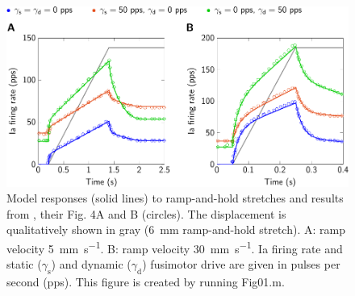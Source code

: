 \documentclass[fleqn,10pt]{physiome}
\begin{document}
\begin{figure}
    \centering
    \includegraphics[width=\textwidth]{Figure1.pdf}
    \caption{Model responses (solid lines) to ramp-and-hold stretches and results from \citet{maltenfort2003}, their Fig. 4A and B (circles).  The displacement is qualitatively shown in gray (\SI{6}{\milli\meter} ramp-and-hold stretch). A: ramp velocity \SI{5}{\milli\meter\per\second}. B: ramp velocity \SI{30}{\milli\meter\per\second}. Ia firing rate and static ($\gamma_\mathrm{s}$) and dynamic ($\gamma_\mathrm{d}$) fusimotor drive are given in pulses per second (pps). This figure is created by running Fig01.m.}
    \label{fig:fig4}
\end{figure}
\end{document}

